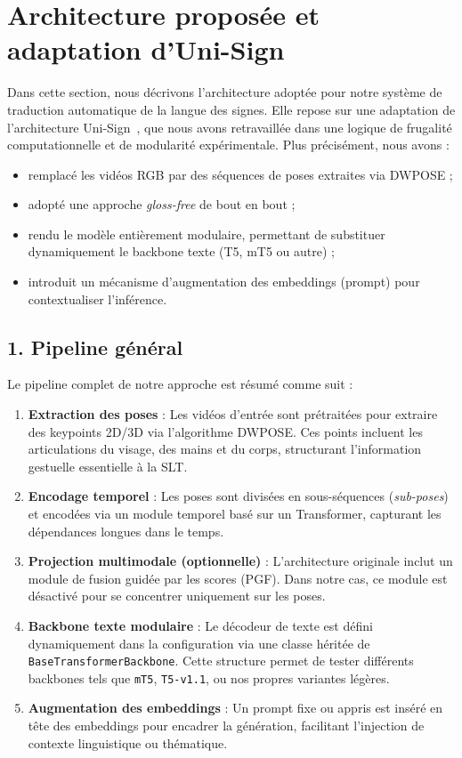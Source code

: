 \section*{Architecture proposée et adaptation d’Uni-Sign}

Dans cette section, nous décrivons l’architecture adoptée pour notre système de traduction automatique de la langue des signes. Elle repose sur une adaptation de l’architecture Uni-Sign~\cite{li2025unisign}, que nous avons retravaillée dans une logique de frugalité computationnelle et de modularité expérimentale. Plus précisément, nous avons :

\begin{itemize}
    \item remplacé les vidéos RGB par des séquences de poses extraites via DWPOSE ;
    \item adopté une approche \textit{gloss-free} de bout en bout ;
    \item rendu le modèle entièrement modulaire, permettant de substituer dynamiquement le backbone texte (T5, mT5 ou autre) ;
    \item introduit un mécanisme d’augmentation des embeddings (prompt) pour contextualiser l’inférence.
\end{itemize}

\subsection*{1. Pipeline général}

Le pipeline complet de notre approche est résumé comme suit :

\begin{enumerate}
    \item \textbf{Extraction des poses} : Les vidéos d’entrée sont prétraitées pour extraire des keypoints 2D/3D via l’algorithme DWPOSE. Ces points incluent les articulations du visage, des mains et du corps, structurant l'information gestuelle essentielle à la SLT.
    \item \textbf{Encodage temporel} : Les poses sont divisées en sous-séquences (\textit{sub-poses}) et encodées via un module temporel basé sur un Transformer, capturant les dépendances longues dans le temps.
    \item \textbf{Projection multimodale (optionnelle)} : L’architecture originale inclut un module de fusion guidée par les scores (PGF). Dans notre cas, ce module est désactivé pour se concentrer uniquement sur les poses.
    \item \textbf{Backbone texte modulaire} : Le décodeur de texte est défini dynamiquement dans la configuration via une classe héritée de \texttt{BaseTransformerBackbone}. Cette structure permet de tester différents backbones tels que \texttt{mT5}, \texttt{T5-v1.1}, ou nos propres variantes légères.
    \item \textbf{Augmentation des embeddings} : Un prompt fixe ou appris est inséré en tête des embeddings pour encadrer la génération, facilitant l’injection de contexte linguistique ou thématique.
\end{enumerate}


